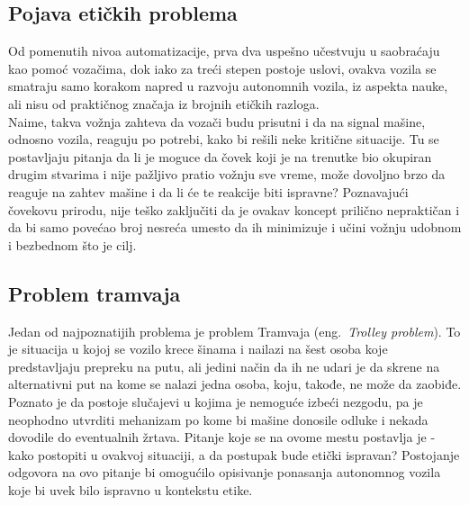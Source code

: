 \documentclass[a4paper]{article}
\begin{document}
\subsection{Pojava etičkih problema}
\label{subsec:Pojava etičkih problema}
Od pomenutih nivoa automatizacije, prva dva uspešno učestvuju u saobraćaju kao pomoć vozačima, dok iako za treći stepen postoje uslovi, ovakva vozila se smatraju samo korakom napred u razvoju autonomnih vozila, iz aspekta nauke, ali nisu od praktičnog značaja iz brojnih etičkih razloga. \cite{eticki_problemi_vozila} \\
Naime, takva vožnja zahteva da vozači budu prisutni i da na signal mašine, odnosno vozila, reaguju po potrebi, kako bi rešili neke kritične situacije. Tu se postavljaju pitanja da li je moguce da čovek koji je na trenutke bio okupiran drugim stvarima i nije pažljivo pratio vožnju sve vreme, može dovoljno brzo da reaguje na zahtev mašine i da li će te reakcije biti ispravne? Poznavajući čovekovu prirodu, nije teško zaključiti da je ovakav koncept prilično nepraktičan i da bi samo povećao broj nesreća umesto da ih minimizuje i učini vožnju udobnom i bezbednom što je cilj.

\subsection{Problem tramvaja}
\label{subsec:Pojava etičkih problema}
Jedan od najpoznatijih problema je problem Tramvaja (eng.~{\em Trolley problem}). To je situacija u kojoj se vozilo krece šinama i nailazi na šest osoba koje predstavljaju prepreku na putu, ali jedini način da ih ne udari je da skrene na alternativni put na kome se nalazi jedna osoba, koju, takođe, ne može da zaobiđe.  \\
Poznato je da postoje slučajevi u kojima je nemoguće izbeći nezgodu, pa je neophodno utvrditi mehanizam po kome bi mašine donosile odluke i nekada dovodile do eventualnih žrtava. Pitanje koje se na ovome mestu postavlja je - kako postopiti u ovakvoj situaciji, a da postupak bude etički ispravan? Postojanje odgovora na ovo pitanje bi omogućilo opisivanje ponasanja autonomnog vozila koje bi uvek bilo ispravno u kontekstu etike.
\end{document}
